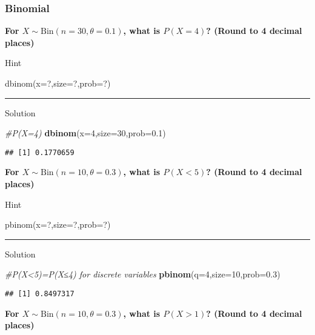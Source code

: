 \documentclass[
]{book}
\newenvironment{Shaded}{\begin{snugshade}}{\end{snugshade}}
\newcommand{\AttributeTok}[1]{\textcolor[rgb]{0.13,0.29,0.53}{#1}}
\newcommand{\CommentTok}[1]{\textcolor[rgb]{0.56,0.35,0.01}{\textit{#1}}}
\newcommand{\DecValTok}[1]{\textcolor[rgb]{0.00,0.00,0.81}{#1}}
\newcommand{\FloatTok}[1]{\textcolor[rgb]{0.00,0.00,0.81}{#1}}
\newcommand{\FunctionTok}[1]{\textcolor[rgb]{0.13,0.29,0.53}{\textbf{#1}}}
\newcommand{\NormalTok}[1]{#1}
\begin{document}
\hypertarget{binomial}{%
\subsubsection{Binomial}\label{binomial}}

\textbf{For \(X \sim \mbox{Bin}(n=30,\theta=0.1)\), what is \(P(X=4)\)? (Round to 4 decimal places)}

Hint

dbinom(x=?,size=?,prob=?)

\begin{center}\rule{0.5\linewidth}{0.5pt}\end{center}

Solution

\begin{Shaded}
\begin{Highlighting}[]
\CommentTok{\#P(X=4)}
\FunctionTok{dbinom}\NormalTok{(}\AttributeTok{x=}\DecValTok{4}\NormalTok{,}\AttributeTok{size=}\DecValTok{30}\NormalTok{,}\AttributeTok{prob=}\FloatTok{0.1}\NormalTok{)}
\end{Highlighting}
\end{Shaded}

\begin{verbatim}
## [1] 0.1770659
\end{verbatim}

\textbf{For \(X \sim \mbox{Bin}(n=10,\theta=0.3)\), what is \(P(X<5)\)? (Round to 4 decimal places)}

Hint

pbinom(x=?,size=?,prob=?)

\begin{center}\rule{0.5\linewidth}{0.5pt}\end{center}

Solution

\begin{Shaded}
\begin{Highlighting}[]
\CommentTok{\#P(X\textless{}5)=P(X≤4) for discrete variables}
\FunctionTok{pbinom}\NormalTok{(}\AttributeTok{q=}\DecValTok{4}\NormalTok{,}\AttributeTok{size=}\DecValTok{10}\NormalTok{,}\AttributeTok{prob=}\FloatTok{0.3}\NormalTok{)}
\end{Highlighting}
\end{Shaded}

\begin{verbatim}
## [1] 0.8497317
\end{verbatim}

\textbf{For \(X \sim \mbox{Bin}(n=10,\theta=0.3)\), what is \(P(X>1)\)? (Round to 4 decimal places)}
\end{document}
